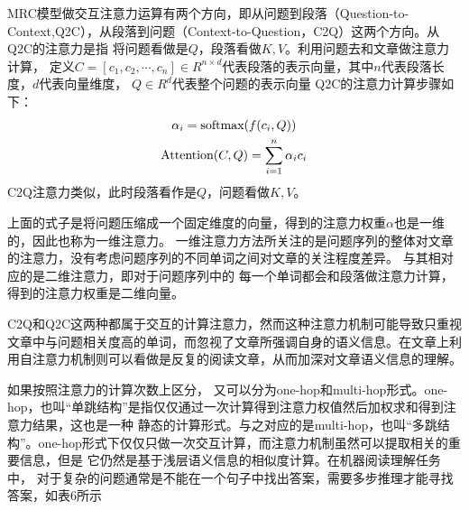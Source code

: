MRC模型做交互注意力运算有两个方向，即从问题到段落（Question-to-Context,Q2C），从段落到问题（Context-to-Question，C2Q）这两个方向。从Q2C的注意力是指
将问题看做是$Q$，段落看做$K,V$。利用问题去和文章做注意力计算，
定义$C=[c_1,c_2,\cdots,c_n] \in R^{n\times d}$代表段落的表示向量，其中$n$代表段落长度，$d$代表向量维度，
$Q\in R^{d}$代表整个问题的表示向量
Q2C的注意力计算步骤如下：
\begin{gather}
\alpha_i=\text{softmax}(f(c_i,Q)) \notag \\
\text{Attention}(C,Q)=\sum_{i=1}^{n}\alpha_{i}c_i \notag 
\end{gather}
C2Q注意力类似，此时段落看作是$Q$，问题看做$K,V$。

上面的式子是将问题压缩成一个固定维度的向量，得到的注意力权重$\alpha$也是一维的，因此也称为一维注意力。
一维注意力方法所关注的是问题序列的整体对文章的注意力，没有考虑问题序列的不同单词之间对文章的关注程度差异。
与其相对应的是二维注意力，即对于问题序列中的
每一个单词都会和段落做注意力计算，得到的注意力权重是二维向量。

C2Q和Q2C这两种都属于交互的计算注意力，然而这种注意力机制可能导致只重视文章中与问题相关度高的单词，而忽视了文章所强调自身的语义信息。在文章上利用自注意力机制则可以看做是反复的阅读文章，从而加深对文章语义信息的理解。








如果按照注意力的计算次数上区分，
又可以分为one-hop和multi-hop形式。one-hop，也叫“单跳结构”是指仅仅通过一次计算得到注意力权值然后加权求和得到注意力结果，这也是一种
静态的计算形式。与之对应的是multi-hop，也叫“多跳结构”。one-hop形式下仅仅只做一次交互计算，而注意力机制虽然可以提取相关的重要信息，但是
它仍然是基于浅层语义信息的相似度计算。在机器阅读理解任务中，
对于复杂的问题通常是不能在一个句子中找出答案，需要多步推理才能寻找答案，如表6所示

